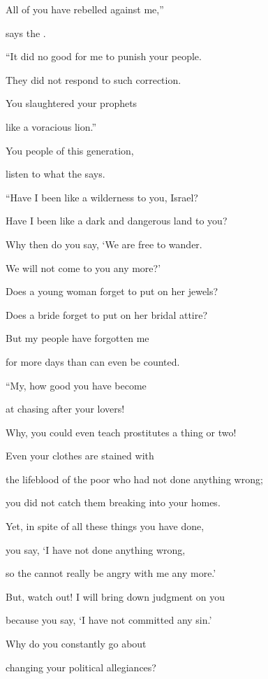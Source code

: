 {\par }{\Q All
of you have rebelled
against me,”
\par }{\Q says
the {}.
\par }{\Q {}“It did no good
for me to punish
your people.
\par }{\Q They did not
respond
to such correction.
\par }{\Q You slaughtered
your prophets
\par }{\Q like a voracious
lion.”
\par }{\Q {}You
people
of this generation,
\par }{\Q listen to what
the {}
says.
\par }{\Q “Have I been like a wilderness
to you, Israel?
\par }{\Q Have I been like a dark
and dangerous land
to you?

\par }{\Q Why
then do you say,
‘We are free to wander.
\par }{\Q We will not
come
to you any more?’
\par }{\Q {}Does a young woman
forget
to put on her jewels?
\par }{\Q Does a bride
forget to put on her bridal attire?
\par }{\Q But my people
have forgotten
me
\par }{\Q for more days
than can even be counted.
\par }{\Q {}“My, how
good
you have become
\par }{\Q at chasing
after your lovers!

\par }{\Q Why,
you could even
teach
prostitutes
a thing
or two!
\par }{\Q {}Even
your clothes
are stained
with
\par }{\Q the lifeblood
of the poor
who had not done anything wrong;
\par }{\Q you did not catch
them breaking
into your homes.

\par }{\Q Yet,
in spite of all
these things you have done,
\par }{\Q {}you say,
‘I have not done anything wrong,
\par }{\Q so the
{}
cannot really be angry
with me any
more.’
\par }{\Q But, watch out! I
will bring down judgment
on
you
\par }{\Q because
you say,
‘I have not
committed any sin.’
\par }{\Q {}Why
do you constantly
go
about
\par }{\Q changing
your political allegiances?

}
